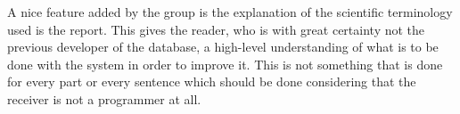 \documentclass[a4paper,11pt]{article}
\begin{document}
A nice feature added by the group is the explanation of the scientific terminology used is the report. This gives the reader, who is with great certainty not the previous developer of the database, a high-level understanding of what is to be done with the system in order to improve it. This is not something that is done for every part or every sentence which should be done considering that the receiver is not a programmer at all. 
\end{document}
